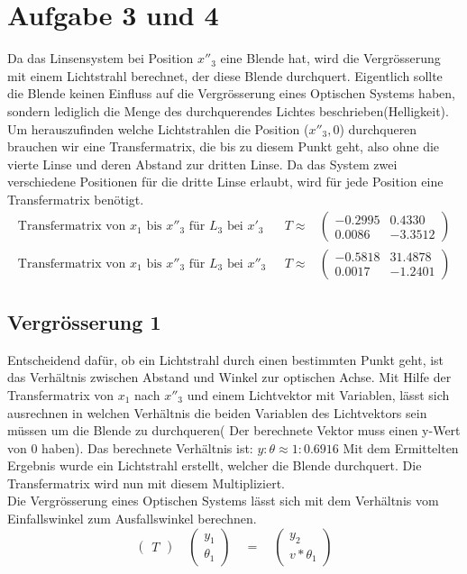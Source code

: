 \documentclass[11pt,twoside,a4paper]{article}
\begin{document}
	\section{Aufgabe 3 und 4}
	Da das Linsensystem bei Position \(x''_{3}\) eine Blende hat, wird die Vergrösserung mit einem Lichtstrahl berechnet, der diese Blende durchquert. Eigentlich sollte die Blende keinen Einfluss auf die Vergrösserung eines Optischen Systems haben, sondern lediglich die Menge des durchquerendes Lichtes beschrieben(Helligkeit). \\
	Um herauszufinden welche Lichtstrahlen die Position (\(x''_{3},0\)) durchqueren brauchen wir eine Transfermatrix, die bis zu diesem Punkt geht, also ohne die vierte Linse und deren Abstand zur dritten Linse.
	Da das System zwei verschiedene Positionen für die dritte Linse erlaubt, wird für jede Position eine Transfermatrix benötigt. 
	\begin{equation*}
	\begin{aligned}
	\textrm{Transfermatrix von \(x_{1}\) bis \(x''_{3}\) für \(L_{3}\) bei \(x'_{3}\) } & T \approx
	&
	\begin{pmatrix}
	-0.2995 & 0.4330\\
	0.0086 & -3.3512
	\end{pmatrix}\\
	\textrm{Transfermatrix von \(x_{1}\) bis \(x''_{3}\) für \(L_{3}\) bei \(x''_{3}\) } & T \approx
	&
	\begin{pmatrix}
	-0.5818 & 31.4878\\
	0.0017 & -1.2401
	\end{pmatrix}
	\end{aligned}
	\end{equation*}
	\subsection{Vergrösserung 1}
	Entscheidend dafür, ob ein Lichtstrahl durch einen bestimmten Punkt geht, ist das Verhältnis zwischen Abstand und Winkel zur optischen Achse. Mit Hilfe der Transfermatrix von \(x_{1}\) nach \(x''_{3}\) und einem Lichtvektor mit Variablen, lässt sich ausrechnen in welchen Verhältnis die beiden Variablen des Lichtvektors sein müssen um die Blende zu durchqueren( Der berechnete Vektor muss einen y-Wert von 0 haben). Das berechnete Verhältnis ist: \(y:\theta \approx 1:0.6916\) Mit dem Ermittelten Ergebnis wurde ein Lichtstrahl erstellt, welcher die Blende durchquert. Die Transfermatrix wird nun mit diesem Multipliziert. \\
	Die Vergrösserung eines Optischen Systems lässt sich mit dem Verhältnis vom Einfallswinkel zum Ausfallswinkel berechnen. 
	\begin{equation} \label{vergr}
	\begin{pmatrix}
	T
	\end{pmatrix}
	\quad
	\begin{pmatrix}
	y_{1}\\
	\theta_{1}
	\end{pmatrix}
	\quad
	=
	\quad
	\begin{pmatrix}
	y_{2}\\
	v * \theta_{1}
	\end{pmatrix}
	\end{equation}
	
\end{document}
